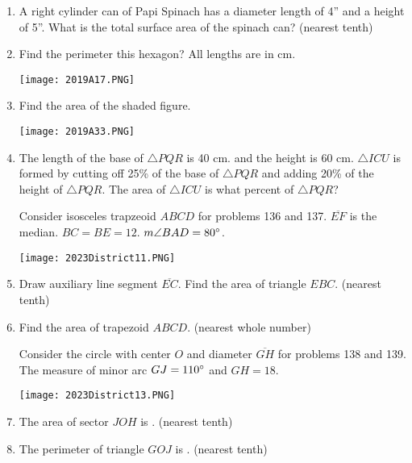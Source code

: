 \documentclass[../uilmath.tex]{subfiles}
\begin{document}
\begin{enumerate}[label=\bfseries\arabic*.]
    \item %
    A right cylinder can of Papi Spinach has a diameter length of 4'' and a height of 5''. What is the total surface area of the spinach can? (nearest tenth)

    \item %
    Find the perimeter this hexagon? All lengths are in cm.
    \begin{center}
        \texttt{[image: 2019A17.PNG]}
    \end{center}

    \item %
    Find the area of the shaded figure.
    \begin{center}
        \texttt{[image: 2019A33.PNG]}
    \end{center}

    \item %
    The length of the base of $\triangle PQR$ is 40 cm. and the height is 60 cm. $\triangle ICU$ is formed by cutting off 
    25\% of the base of $\triangle PQR$ and adding 20\% of the height of $\triangle PQR$. The area of $\triangle ICU$ is what percent of $\triangle PQR$?


    Consider isosceles trapzeoid $ABCD$ for problems 136 and 137. $\overline{EF}$ is the median.
    $BC=BE=12$. $m\angle BAD = 80\degree$.
    \begin{center}
        \texttt{[image: 2023District11.PNG]}
    \end{center}

    \item %
    Draw auxiliary line segment $\overline{EC}$. Find the area of triangle $EBC$. (nearest tenth)

    \item %
    Find the area of trapezoid $ABCD$. (nearest whole number)


    Consider the circle with center $O$ and diameter $\overline{GH}$ for problems 138 and 139.
    The measure of minor arc $GJ=110\degree$ and $GH=18$.
    \begin{center}
        \texttt{[image: 2023District13.PNG]}
    \end{center}

    \item %
    The area of sector $JOH$ is \blank. (nearest tenth)

    \item %
    The perimeter of triangle $GOJ$ is \blank. (nearest tenth)


\end{enumerate}
\end{document}
